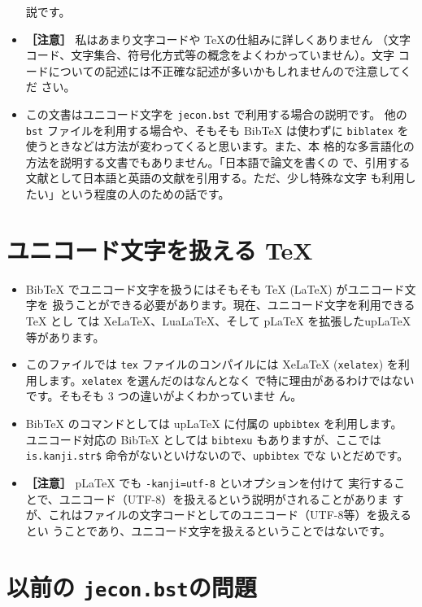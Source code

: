 \documentclass[a4paper,10pt]{bxjsarticle}
\begin{document}
\begin{itemize}
       説です。
 \item \textbf{［注意］} 私はあまり文字コードや \TeX の仕組みに詳しくありません
       （文字コード、文字集合、符号化方式等の概念をよくわかっていません）。文字
       コードについての記述には不正確な記述が多いかもしれませんので注意してくだ
       さい。
 \item この文書はユニコード文字を \texttt{jecon.bst} で利用する場合の説明です。
       他の \texttt{bst} ファイルを利用する場合や、そもそも BibTeX は使わずに
       \texttt{biblatex} を使うときなどは方法が変わってくると思います。また、本
       格的な多言語化の方法を説明する文書でもありません。「日本語で論文を書くの
       で、引用する文献として日本語と英語の文献を引用する。ただ、少し特殊な文字
       も利用したい」という程度の人のための話です。
\end{itemize}

\section{ユニコード文字を扱える \TeX}

\begin{itemize}
 \item BibTeX でユニコード文字を扱うにはそもそも TeX (LaTeX) がユニコード文字を
       扱うことができる必要があります。現在、ユニコード文字を利用できる TeX とし
       ては XeLaTeX、LuaLaTeX、そして pLaTeX を拡張したupLaTeX 等があります。
 \item このファイルでは \texttt{tex} ファイルのコンパイルには XeLaTeX
       (\texttt{xelatex}) を利用します。\texttt{xelatex} を選んだのはなんとなく
       で特に理由があるわけではないです。そもそも 3 つの違いがよくわかっていませ
       ん。
 \item BibTeX のコマンドとしては upLaTeX に付属の \texttt{upbibtex} を利用します。
       ユニコード対応の BibTeX としては \texttt{bibtexu} もありますが、ここでは
       \texttt{is.kanji.str\$} 命令がないといけないので、\texttt{upbibtex} でな
       いとだめです。
 \item \textbf{［注意］} pLaTeX でも \verb|-kanji=utf-8| といオプションを付けて
       実行することで、ユニコード（UTF-8）を扱えるという説明がされることがありま
       すが、これはファイルの文字コードとしてのユニコード（UTF-8等）を扱えるとい
       うことであり、ユニコード文字を扱えるということではないです。
\end{itemize}

\section{以前の \texttt{jecon.bst}の問題}
\label{jecon-problem}
\end{document}
